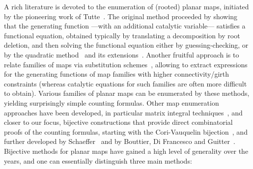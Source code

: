 \documentclass[letter]{amsart}
\numberwithin{theo}{section}
\theoremstyle{remark}
\begin{document}
A rich literature is devoted to the enumeration of (rooted) planar maps, initiated by the pioneering work of Tutte~\cite{tutte1962census,tutte1963census}. The original method proceeded by showing that the generating function ---with an additional catalytic variable--- satisfies a functional equation, obtained typically by translating a decomposition by root deletion, and then solving the functional equation either by guessing-checking, or by the quadratic method~\cite{Tutte73} and its extensions~\cite{Bousquet-MelouJ06,eynard2016counting}. Another fruitful approach is to relate families of maps via substitution schemes~\cite{tutte1963census,mullin1968enumeration,banderier2001random,gao2001,BouttierG14}, allowing to extract expressions for the generating functions of map families with higher connectivity/girth constraints (whereas catalytic equations for such families are often more difficult to obtain).   
Various families of planar maps can be enumerated 
by these methods, %
 yielding surprisingly simple counting formulas.  
Other map enumeration approaches have been developed, in particular matrix integral techniques~\cite{di19952d}, and closer to our focus, bijective constructions that provide direct combinatorial proofs of the counting formulas, starting with the Cori-Vauquelin bijection~\cite{cori1981planar}, and further developed by Schaeffer~\cite{Schaeffer:these} and by Bouttier, Di Francesco and Guitter~\cite{bouttier2002census,BouttierFG04}. Bijective methods for planar maps have gained a high level of generality over the years, and one can essentially distinguish three main methods:
\end{document}
